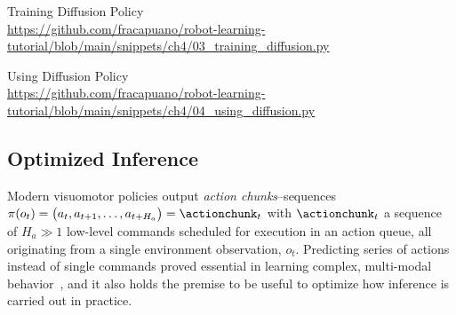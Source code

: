 \begin{pbox}[label={ex:diffusion_training}]{Training Diffusion Policy \\ \url{https://github.com/fracapuano/robot-learning-tutorial/blob/main/snippets/ch4/03_training_diffusion.py}}
    
\end{pbox}

\begin{pbox}[label={ex:diffusion_using}]{Using Diffusion Policy \\ \url{https://github.com/fracapuano/robot-learning-tutorial/blob/main/snippets/ch4/04_using_diffusion.py}}
    
\end{pbox}

\subsection{Optimized Inference}
\label{sec:ch4-async-inference}
Modern visuomotor policies output \emph{action chunks}--sequences \(\pi(o_t) = \bigl(a_t,a_{t+1},\dots,a_{t+H_a}\bigr) = \actionchunk_t \) with \(\actionchunk_t \) a sequence of \(H_a \gg 1 \) low-level commands scheduled for execution in an action queue, all originating from a single environment observation, \(o_t\).
Predicting series of actions instead of single commands proved essential in learning complex, multi-modal behavior~\citep{zhaoLearningFineGrainedBimanual2023,chiDiffusionPolicyVisuomotor2024}, and it also holds the premise to be useful to optimize how inference is carried out in practice.

